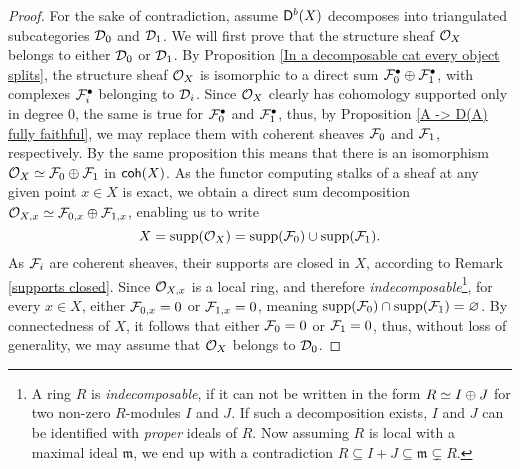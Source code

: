 \begin{proof}
    For the sake of contradiction, assume $\mathsf{D}^b(X)$ decomposes into triangulated subcategories $\mathcal D_0$ and $\mathcal D_1$. We will first prove that the structure sheaf ${\mathcal{O}_{X}}$ belongs to either $\mathcal D_0$ or $\mathcal D_1$.
    By Proposition \ref{In a decomposable cat every object splits}, the  structure sheaf ${\mathcal{O}_{X}}$ is isomorphic to a direct sum $\mathcal F_0^\bullet \oplus \mathcal F_1^\bullet$, with complexes $\mathcal F_i^\bullet$ belonging to $\mathcal D_i$.
    Since ${\mathcal{O}_{X}}$ clearly has cohomology supported only in degree $0$, the same is true for $\mathcal F_0^\bullet$ and $\mathcal F_1^\bullet$, thus, by Proposition \ref{A -> D(A) fully faithful}, we may replace them with coherent sheaves $\mathcal F_0$ and $\mathcal F_1$, respectively. By the same proposition this means that there is an isomorphism ${\mathcal{O}_{X}} \simeq \mathcal F_0 \oplus \mathcal F_1$ in $\mathsf{coh}(X)$. As the functor computing stalks of a sheaf at any given point $x \in X$ is exact, we obtain a direct sum decomposition $\mathcal O_{X,x} \simeq \mathcal F_{0,x} \oplus \mathcal F_{1,x}$, enabling us to write
    \[
        X = \operatorname{supp}({\mathcal{O}_{X}}) = \operatorname{supp}(\mathcal F_0) \cup \operatorname{supp}(\mathcal F_1).
    \]
    As $\mathcal F_i$ are coherent sheaves, their supports are closed in $X$, according to Remark \ref{supports closed}. Since $\mathcal O_{X,x}$ is a local ring, and therefore \emph{indecomposable}\footnote{
        A ring $R$ is \emph{indecomposable}, if it can not be written in the form $R \simeq I \oplus J$ for two non-zero $R$-modules $I$ and $J$. If such a decomposition exists, $I$ and $J$ can be identified with \emph{proper} ideals of $R$. Now assuming $R$ is local with a maximal ideal $\mathfrak{m}$, we end up with a contradiction $R \subseteq I + J \subseteq \mathfrak{m} \subsetneq R$.
    }, for every $x \in X$, either $\mathcal F_{0,x} = 0$ or $\mathcal F_{1,x} = 0$, meaning $\operatorname{supp}(\mathcal F_0) \cap \operatorname{supp}(\mathcal F_1) = \varnothing$. By connectedness of $X$, it follows that either $\mathcal F_0 = 0$ or $\mathcal F_1 = 0$, thus, without loss of generality, we may assume that ${\mathcal{O}_{X}}$ belongs to $\mathcal D_0$. 


\end{proof}

